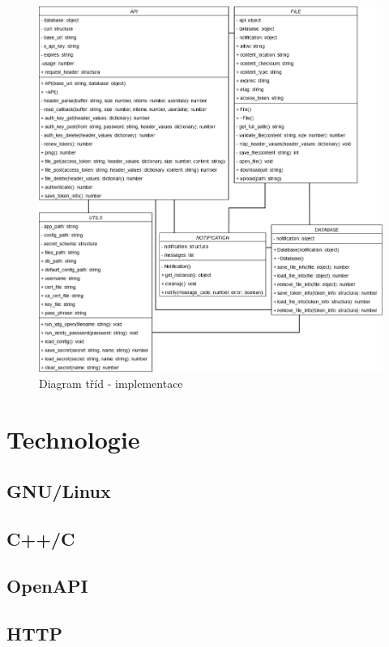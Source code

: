 \begin{figure}
    \includegraphics[width=1\linewidth]{other-fig/class_diagram_after_implementation.png}
    \caption{Diagram tříd - implementace}
    \label{fig:class_diagram_implementation}
\end{figure}

\section{Technologie}
\subsection{GNU/Linux}
\subsection{C++/C}
\subsection{OpenAPI}
\subsection{HTTP}

\cite{RFC7231}
\cite{HTTP3}

